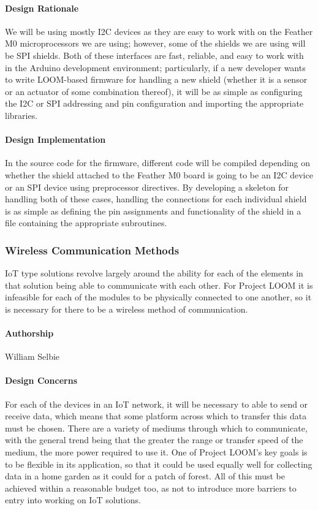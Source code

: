 \documentclass[onecolumn, draftclsnofoot,10pt, compsoc]{IEEEtran}
\begin{document}
\paragraph{Design Rationale}
    We will be using mostly I2C devices as they are easy to work with on the Feather M0 microprocessors we are using; however, some of the shields we are using will be SPI shields. Both of these interfaces are fast, reliable, and easy to work with in the Arduino development environment; particularly, if a new developer wants to write LOOM-based firmware for handling a new shield (whether it is a sensor or an actuator of some combination thereof), it will be as simple as configuring the I2C or SPI addressing and pin configuration and importing the appropriate libraries.

\paragraph{Design Implementation}
    In the source code for the firmware, different code will be compiled depending on whether the shield attached to the Feather M0 board is going to be an I2C device or an SPI device using preprocessor directives. By developing a skeleton for handling both of these cases, handling the connections for each individual shield is as simple as defining the pin assignments and functionality of the shield in a file containing the appropriate subroutines.


\subsubsection{Wireless Communication Methods}
    IoT type solutions revolve largely around the ability for each of the elements in that solution being able to communicate with each other. For Project LOOM it is infeasible for each of the modules to be physically connected to one another, so it is necessary for there to be a wireless method of communication. 

\paragraph{Authorship}
    William Selbie

\paragraph{Design Concerns}
    For each of the devices in an IoT network, it will be necessary to able to send or receive data, which means that some platform across which to transfer this data must be chosen. There are a variety of mediums through which to communicate, with the general trend being that the greater the range or transfer speed of the medium, the more power required to use it. One of Project LOOM's key goals is to be flexible in its application, so that it could be used equally well for collecting data in a home garden as it could for a patch of forest. All of this must be achieved within a reasonable budget too, as not to introduce more barriers to entry into working on IoT solutions. 
\end{document}
